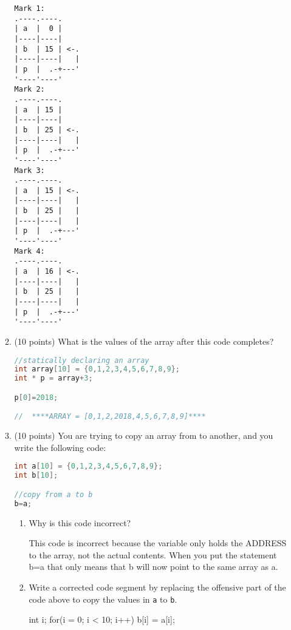 \documentclass{article}[9pt]
\newenvironment{answerfont}{\fontfamily{qhv}\selectfont}{\par}
\newenvironment{myanswer}{\begin{mdframed}\begin{answerfont}}{\end{answerfont}\end{mdframed}}
\begin{document}
\begin{enumerate}
\begin{enumerate}
\begin{myanswer}
\begin{verbatim}
Mark 1:
.----.----.
| a  |  0 |
|----|----|
| b  | 15 | <-.
|----|----|   |
| p  |  .-+---'
'----'----'
Mark 2:
.----.----.
| a  | 15 |
|----|----|
| b  | 25 | <-.
|----|----|   |
| p  |  .-+---'
'----'----'
Mark 3:
.----.----.
| a  | 15 | <-.
|----|----|   |
| b  | 25 |   |
|----|----|   |
| p  |  .-+---'
'----'----'
Mark 4:
.----.----.
| a  | 16 | <-.
|----|----|   |
| b  | 25 |   |
|----|----|   |
| p  |  .-+---'
'----'----'
\end{verbatim}
\end{myanswer}

\item (10 points) What is the values of the array after this code completes?

\begin{lstlisting}[language=c]
//statically declaring an array
int array[10] = {0,1,2,3,4,5,6,7,8,9};
int * p = array+3;

p[0]=2018;

//  ****ARRAY = [0,1,2,2018,4,5,6,7,8,9]****
\end{lstlisting}

\item (10 points) You are trying to copy an array from to another, and you write the following code:

\begin{lstlisting}[language=c]
int a[10] = {0,1,2,3,4,5,6,7,8,9};
int b[10];

//copy from a to b
b=a;
\end{lstlisting}


\begin{enumerate}
\item Why is this code incorrect?


\begin{myanswer}
This code is incorrect because the variable only holds the ADDRESS to the array, not the actual contents. When you put the statement b=a that only means that b will now point to the same array as a.
\end{myanswer}


\item Write a corrected code segment by replacing the offensive part
of the code above to copy the values in \texttt{a} to \texttt{b}.

\begin{myanswer}
int i;
  for(i = 0; i < 10; i++)
  b[i] = a[i];
\end{myanswer}


\end{enumerate}
\end{enumerate}
\end{enumerate}
\end{document}
